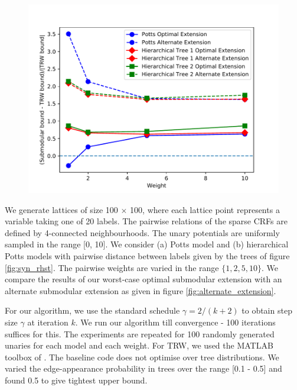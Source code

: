 \begin{figure}
\centering
\includegraphics[scale = 0.80]{./figures/synthetic_upper_bound_comparison.pdf}
\label{fig:syn_plot}
\end{figure}


\label{subsec:synthetic}
 We generate lattices of size 100 $\times$ 100, where each
lattice point represents a variable taking one of 20 labels. The pairwise
relations of the sparse CRFs are defined by 4-connected neighbourhoods. The
unary potentials are uniformly sampled in the range [0, 10]. We consider (a)
Potts model and (b) hierarchical Potts models with pairwise distance between
labels given by the trees of figure \ref{fig:syn_rhst}. The pairwise weights
are varied in the range $\{1, 2, 5, 10\}$. We compare the results of
our worst-case optimal submodular extension with an alternate submodular
extension as given in figure \ref{fig:alternate_extension}.

 For our algorithm, we use the standard schedule $\gamma
= 2/(k + 2)$ to obtain step size $\gamma$ at iteration $k$. We run our
algorithm till convergence - 100 iterations suffices for this. The experiments are repeated for 100 randomly generated unaries for each model and each weight. For TRW, we used the MATLAB toolbox of \citep{domke2013learning}. The baseline code does not optimise over tree distributions. We varied the edge-appearance probability in trees over the range [0.1 - 0.5] and found 0.5 to give tightest upper bound.

